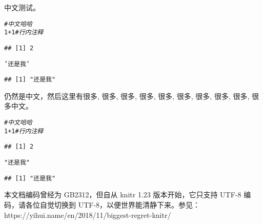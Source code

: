 \documentclass[UTF-8]{ctexart}\usepackage[]{graphicx}\usepackage[]{color}
\makeatletter
\newcommand{\hlnum}[1]{\textcolor[rgb]{0.686,0.059,0.569}{#1}}%
\newcommand{\hlstr}[1]{\textcolor[rgb]{0.192,0.494,0.8}{#1}}%
\newcommand{\hlcom}[1]{\textcolor[rgb]{0.678,0.584,0.686}{\textit{#1}}}%
\newcommand{\hlopt}[1]{\textcolor[rgb]{0,0,0}{#1}}%
\newenvironment{kframe}{%
 \def\at@end@of@kframe{}%
 \ifinner\ifhmode%
  \def\at@end@of@kframe{\end{minipage}}%
  \begin{minipage}{\columnwidth}%
 \fi\fi%
 \def\FrameCommand##1{\hskip\@totalleftmargin \hskip-\fboxsep
 \colorbox{shadecolor}{##1}\hskip-\fboxsep
     \hskip-\linewidth \hskip-\@totalleftmargin \hskip\columnwidth}%
 \MakeFramed {\advance\hsize-\width
   \@totalleftmargin\z@ \linewidth\hsize
   \@setminipage}}%
 {\par\unskip\endMakeFramed%
 \at@end@of@kframe}
\newenvironment{knitrout}{}{} %
\makeatother
\begin{document}
中文测试。

\begin{knitrout}
\color{fgcolor}\begin{kframe}
\begin{alltt}
\hlcom{# 中文哈哈}
\hlnum{1}\hlopt{+}\hlnum{1} \hlcom{# 行内注释}
\end{alltt}
\begin{verbatim}
## [1] 2
\end{verbatim}
\begin{alltt}
\hlstr{'还是我'}
\end{alltt}
\begin{verbatim}
## [1] "还是我"
\end{verbatim}
\end{kframe}
\end{knitrout}

仍然是中文，然后这里有很多, 很多, 很多, 很多, 很多, 很多, 很多, 很多, 很多, 很多中文。

\begin{knitrout}
\color{fgcolor}\begin{kframe}
\begin{alltt}
\hlcom{# 中文哈哈}
\hlnum{1} \hlopt{+} \hlnum{1}  \hlcom{# 行内注释}
\end{alltt}
\begin{verbatim}
## [1] 2
\end{verbatim}
\begin{alltt}
\hlstr{"还是我"}
\end{alltt}
\begin{verbatim}
## [1] "还是我"
\end{verbatim}
\end{kframe}
\end{knitrout}

本文档编码曾经为 GB2312，但自从 knitr 1.23 版本开始，它只支持 UTF-8 编码，请各位自觉切换到 UTF-8，以便世界能清静下来。参见：https://yihui.name/en/2018/11/biggest-regret-knitr/
\end{document}

